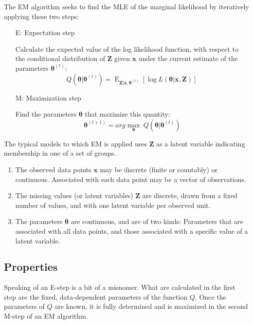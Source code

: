 The EM algorithm seeks to find the MLE of the marginal likelihood by iteratively applying these two steps:
\begin{itemize}
	\item[E:]  Expectation step

		Calculate the expected value of the log likelihood function, with respect to the conditional distribution of $\mathbf {Z}$ given $\boldsymbol x$  under the current estimate of the parameters $\boldsymbol\theta^{(t)}$:
	\begin{equation*}
		Q(\boldsymbol\theta|\boldsymbol\theta^{(t)}) = \operatorname{E}_{\mathbf{Z}|\boldsymbol x,\boldsymbol\theta^{(t)}}\left[ \log L (\boldsymbol\theta| \boldsymbol x,\mathbf{Z})  \right] \,
	\end{equation*}
	\item[M:] Maximization step

		Find the parameters $\boldsymbol\theta$ that maximize this quantity:
	\begin{equation*}
		\boldsymbol\theta^{(t+1)} = arg\underset{\boldsymbol\theta}{\max} \ Q(\boldsymbol\theta| \boldsymbol\theta^{(t)})
	\end{equation*}
\end{itemize}
The typical models to which EM is applied uses $\mathbf{Z}$ as a latent variable indicating membership in one of a set of groups.
\begin{enumerate}
	\item The observed data points $\boldsymbol x$ may be discrete (finite or countably) or continuous. Associated with each data point may be a vector of observations.

	\item The missing values (or latent variables) $\mathbf{Z}$ are discrete, drawn from a fixed number of values, and with one latent variable per observed unit.

	\item The parameters $\boldsymbol\theta$ are continuous, and are of two kinds: Parameters that are associated with all data points, and those associated with a specific value of a latent variable.
\end{enumerate}


\subsection{Properties}
Speaking of an E-step is a bit of a misnomer. What are calculated in the first step are the fixed, data-dependent parameters of the function $Q$. Once the parameters of $Q$ are known, it is fully determined and is maximized in the second M-step of an EM algorithm.

